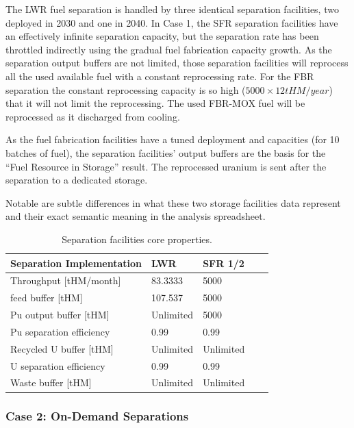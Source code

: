 \documentclass[12pt]{article}
\begin{document}
The LWR fuel separation is handled by three identical separation facilities, two
deployed in 2030 and one in 2040. In Case 1, the SFR separation facilities have
an effectively infinite separation capacity, but the separation rate has been
throttled indirectly using the gradual fuel fabrication capacity growth.  As the
separation output buffers are not limited, those separation facilities will
reprocess all the used available fuel with a constant reprocessing rate. For the
FBR separation the constant reprocessing capacity is so high ($5000\times12
tHM/year$) that it will not limit the reprocessing. The used FBR-MOX fuel will
be reprocessed as it discharged from cooling.

As the fuel fabrication facilities have a tuned deployment and capacities (for
10 batches of fuel), the separation facilities' output buffers are the basis for
the ``Fuel Resource in Storage'' result.  The reprocessed uranium is sent after
the separation to a dedicated storage.

Notable are subtle differences in what these two storage facilities data represent
and their exact semantic meaning in the analysis spreadsheet.

\begin{table}[h!]
    \centering
    \begin{tabular}{lllll}
    \hline
    Separation Implementation  &  LWR        &  SFR 1/2    \\
    \hline
    Throughput [tHM/month]     &  83.3333    &  5000       \\
    feed buffer [tHM]          &  107.537    &  5000       \\
    Pu output buffer [tHM]     &  Unlimited  &  5000       \\
    Pu separation efficiency   &  0.99       &  0.99       \\
    Recycled U buffer [tHM]    &  Unlimited  &  Unlimited  \\
    U separation efficiency    &  0.99       &  0.99       \\
    Waste buffer [tHM]         &  Unlimited  &  Unlimited  \\
    \hline
    \end{tabular}
    \caption{Separation facilities core properties. }
    \label{tab:separation_1}
\end{table}

\subsubsection{Case 2: On-Demand Separations}
\label{sec:case2}
\end{document}
